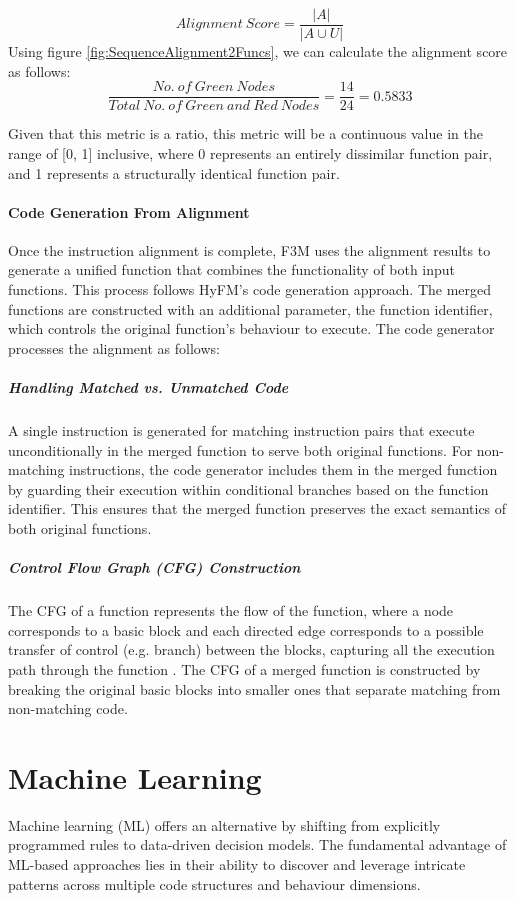 $$Alignment\ Score = \frac{|A|}{|A\cup U|}$$
Using figure \ref{fig:SequenceAlignment2Funcs}, we can calculate the alignment score as follows:
$$\frac{No.\ of\ Green\ Nodes}{Total\ No.\ of\ Green\ and\ Red\ Nodes}=\frac{14}{24} = 0.5833$$

Given that this metric is a ratio, this metric will be a continuous value in the range of [0, 1] inclusive, where 0 represents an entirely dissimilar function pair, and 1 represents a structurally identical function pair.

\paragraph{Code Generation From Alignment}
Once the instruction alignment is complete, F3M uses the alignment results to generate a unified function that combines the functionality of both input functions. This process follows HyFM's code generation approach. The merged functions are constructed with an additional parameter, the function identifier, which controls the original function's behaviour to execute. The code generator processes the alignment as follows:

\subparagraph{Handling Matched vs. Unmatched Code}
A single instruction is generated for matching instruction pairs that execute unconditionally in the merged function to serve both original functions. For non-matching instructions, the code generator includes them in the merged function by guarding their execution within conditional branches based on the function identifier. This ensures that the merged function preserves the exact semantics of both original functions.

\subparagraph{Control Flow Graph (CFG) Construction}
The CFG of a function represents the flow of the function, where a node corresponds to a basic block and each directed edge corresponds to a possible transfer of control (e.g. branch) between the blocks, capturing all the execution path through the function \cite{ControlFlowGraph}. The CFG of a merged function is constructed by breaking the original basic blocks into smaller ones that separate matching from non-matching code.


\section{Machine Learning} \label{Background:ML}
Machine learning (ML) offers an alternative by shifting from explicitly programmed rules to data-driven decision models. The fundamental advantage of ML-based approaches lies in their ability to discover and leverage intricate patterns across multiple code structures and behaviour dimensions.

